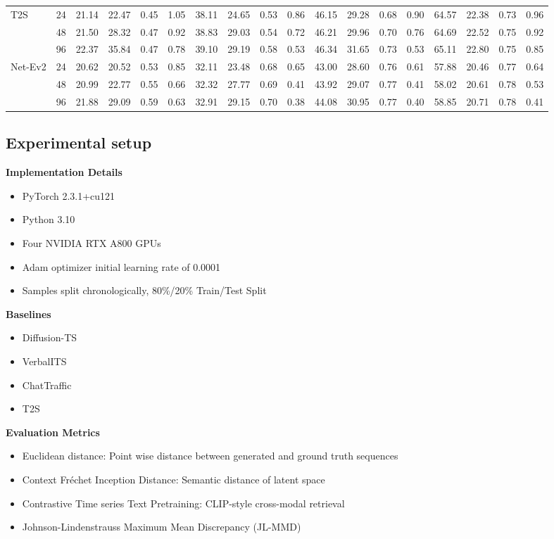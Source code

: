 \documentclass[11pt]{article}
\begin{document}
\begin{table}[htbp]
{\begin{tabular}{llcccccccccccccccc}
    \midrule
    T2S          & 24 & 21.14 & 22.47 & 0.45 & 1.05 & 38.11 & 24.65 & 0.53 & 0.86 & 46.15 & 29.28 & 0.68 & 0.90 & 64.57 & 22.38 & 0.73 & 0.96 \\
                 & 48 & 21.50 & 28.32 & 0.47 & 0.92 & 38.83 & 29.03 & 0.54 & 0.72 & 46.21 & 29.96 & 0.70 & 0.76 & 64.69 & 22.52 & 0.75 & 0.92 \\
                 & 96 & 22.37 & 35.84 & 0.47 & 0.78 & 39.10 & 29.19 & 0.58 & 0.53 & 46.34 & 31.65 & 0.73 & 0.53 & 65.11 & 22.80 & 0.75 & 0.85 \\
    \midrule
    Net-Ev2      & 24 & 20.62 & 20.52 & 0.53 & 0.85 & 32.11 & 23.48 & 0.68 & 0.65 & 43.00 & 28.60 & 0.76 & 0.61 & 57.88 & 20.46 & 0.77 & 0.64 \\
                 & 48 & 20.99 & 22.77 & 0.55 & 0.66 & 32.32 & 27.77 & 0.69 & 0.41 & 43.92 & 29.07 & 0.77 & 0.41 & 58.02 & 20.61 & 0.78 & 0.53 \\
                 & 96 & 21.88 & 29.09 & 0.59 & 0.63 & 32.91 & 29.15 & 0.70 & 0.38 & 44.08 & 30.95 & 0.77 & 0.40 & 58.85 & 20.71 & 0.78 & 0.41 \\
    \bottomrule
  \end{tabular}%
  }
\end{table}

\subsection{Experimental setup}

\textbf{Implementation Details}
\begin{itemize}
  \item PyTorch 2.3.1+cu121
  \item Python 3.10
  \item Four NVIDIA RTX A800 GPUs
  \item Adam optimizer initial learning rate of 0.0001
  \item Samples split chronologically, 80\%/20\% Train/Test Split
\end{itemize}

\noindent\textbf{Baselines}
\begin{itemize}
  \item Diffusion-TS
  \item VerbalITS
  \item ChatTraffic
  \item T2S
\end{itemize}

\noindent\textbf{Evaluation Metrics}
\begin{itemize}
  \item Euclidean distance: Point wise distance between generated and ground truth sequences
  \item Context Fréchet Inception Distance: Semantic distance of latent space
  \item Contrastive Time series Text Pretraining: CLIP-style cross-modal retrieval
  \item Johnson-Lindenstrauss Maximum Mean Discrepancy (JL-MMD)
\end{itemize}
\end{document}
